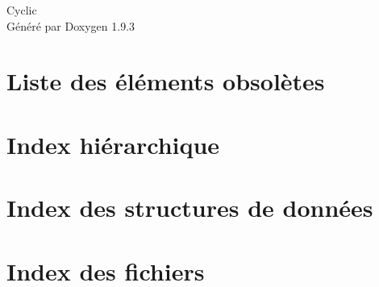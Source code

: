 \documentclass[twoside]{book}
\newcommand{\+}{\discretionary{\mbox{\scriptsize$\hookleftarrow$}}{}{}}
\newcommand{\clearemptydoublepage}{%
    \newpage{\pagestyle{empty}\cleardoublepage}%
  }
\begin{document}
  \raggedbottom
    \hypersetup{pageanchor=false,
                bookmarksnumbered=true,
                pdfencoding=unicode
               }
  \begin{titlepage}
  \vspace*{7cm}
  \begin{center}%
  {\Large Cyclic}\\
  \vspace*{1cm}
  {\large Généré par Doxygen 1.9.3}\\
  \end{center}
  \end{titlepage}
  \clearemptydoublepage
  \tableofcontents
  \clearemptydoublepage
  \hypersetup{pageanchor=true}
\chapter{Liste des éléments obsolètes}
\label{deprecated}

\chapter{Index hiérarchique}

\chapter{Index des structures de données}

\chapter{Index des fichiers}

\end{document}
